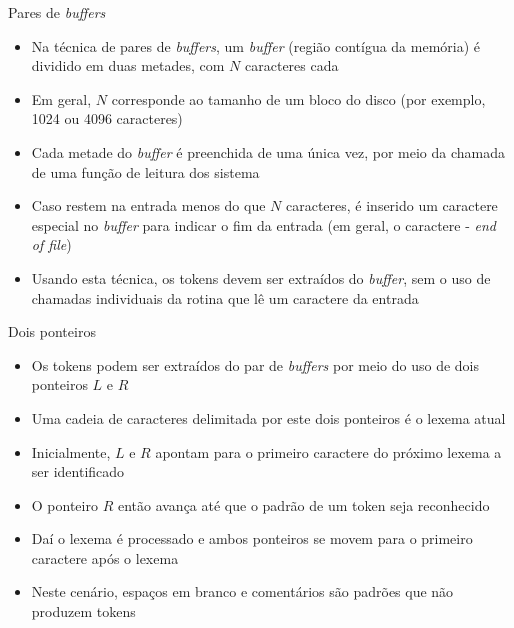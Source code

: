 \begin{frame}[fragile]{Pares de {\it buffers}}

    \begin{itemize}
        \item Na técnica de pares de \textit{buffers}, um \textit{buffer} (região contígua da memória) é dividido em duas metades, com $N$ caracteres cada
        \pause

        \item Em geral, $N$ corresponde ao tamanho de um bloco do disco (por exemplo, 1024 ou 4096 caracteres)
        \pause

        \item Cada metade do \textit{buffer} é preenchida de uma única vez, por meio da chamada de uma função de leitura dos sistema
        \pause

        \item Caso restem na entrada menos do que $N$ caracteres, é inserido um caractere especial no \textit{buffer} para indicar o fim da entrada
            (em geral, o caractere  - \textit{end of file})
        \pause

        \item Usando esta técnica, os tokens devem ser extraídos do \textit{buffer}, sem o uso de chamadas individuais da rotina que lê um caractere da entrada
    \end{itemize}

\end{frame}

\begin{frame}[fragile]{Dois ponteiros}

    \begin{itemize}
        \item Os tokens podem ser extraídos do par de \textit{buffers} por meio do uso de dois ponteiros $L$ e $R$
        \pause

        \item Uma cadeia de caracteres delimitada por este dois ponteiros é o lexema atual
        \pause

        \item Inicialmente, $L$ e $R$ apontam para o primeiro caractere do próximo lexema a ser identificado
        \pause

        \item O ponteiro $R$ então avança até que o padrão de um token seja reconhecido
        \pause

        \item Daí o lexema é processado e ambos ponteiros se movem para o primeiro caractere após o lexema
        \pause

        \item Neste cenário, espaços em branco e comentários são padrões que não produzem tokens
    \end{itemize}

\end{frame}

